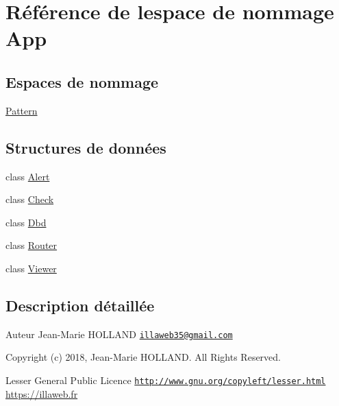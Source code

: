 \hypertarget{namespace_app}{}\section{Référence de l\textquotesingle{}espace de nommage App}
\label{namespace_app}
\subsection*{Espaces de nommage}
\begin{DoxyCompactItemize}
\item 
 \hyperlink{namespace_app_1_1_pattern}{Pattern}
\end{DoxyCompactItemize}
\subsection*{Structures de données}
\begin{DoxyCompactItemize}
\item 
class \hyperlink{class_app_1_1_alert}{Alert}
\item 
class \hyperlink{class_app_1_1_check}{Check}
\item 
class \hyperlink{class_app_1_1_dbd}{Dbd}
\item 
class \hyperlink{class_app_1_1_router}{Router}
\item 
class \hyperlink{class_app_1_1_viewer}{Viewer}
\end{DoxyCompactItemize}


\subsection{Description détaillée}
\begin{DoxyAuthor}{Auteur}
Jean-\/\+Marie H\+O\+L\+L\+A\+ND \href{mailto:illaweb35@gmail.com}{\tt illaweb35@gmail.\+com} 
\end{DoxyAuthor}
\begin{DoxyCopyright}{Copyright}
(c) 2018, Jean-\/\+Marie H\+O\+L\+L\+A\+ND. All Rights Reserved.
\end{DoxyCopyright}
Lesser General Public Licence \href{http://www.gnu.org/copyleft/lesser.html}{\tt http\+://www.\+gnu.\+org/copyleft/lesser.\+html} \hyperlink{}{https\+://illaweb.\+fr}